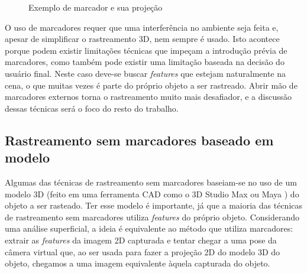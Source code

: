 \begin{figure}[!ht]
	\centerline{
		\hfil
	}
	\caption{Exemplo de marcador e sua projeção}
\end{figure}

O uso de marcadores requer que uma interferência no ambiente seja feita e, apesar de simplificar o rastreamento 3D, nem sempre é usado. Isto acontece porque podem existir limitações técnicas que impeçam a introdução prévia de marcadores, como também pode existir uma limitação baseada na decisão do usuário final. Neste caso deve-se buscar \emph{features} que estejam naturalmente na cena, o que muitas vezes é parte do próprio objeto a ser rastreado. Abrir mão de marcadores externos torna o rastreamento muito mais desafiador, e a discussão dessas técnicas será o foco do resto do trabalho.

\subsection{Rastreamento sem marcadores baseado em modelo}

Algumas das técnicas de rastreamento sem marcadores baseiam-se no uso de um modelo 3D (feito em uma ferramenta CAD como o 3D Studio Max \cite{ref_3dsmax} ou Maya \cite{ref_maya}) do objeto a ser rasteado. Ter esse modelo é importante, já que a maioria das técnicas de rastreamento sem marcadores utiliza \emph{features} do próprio objeto. Considerando uma análise superficial, a ideia é equivalente ao método que utiliza marcadores: extrair as \emph{features} da imagem 2D capturada e tentar chegar a uma pose da câmera virtual que, ao ser usada para fazer a projeção 2D do modelo 3D do objeto, chegamos a uma imagem equivalente àquela capturada do objeto.

